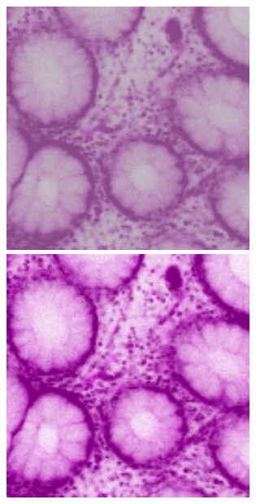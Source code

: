 \begin{figure}[H]
	\centering
	
	\begin{minipage}{0.25\columnwidth}
		\centering
		\includegraphics[clip, width=\linewidth]{fig/preprocessing/data_aug/color/CONTRAST/CONTRAST_0_50}
	\end{minipage}
	\begin{minipage}{0.25\columnwidth}
		\centering
		\includegraphics[clip, width=\linewidth]{fig/preprocessing/data_aug/color/CONTRAST/CONTRAST_1_00}

\end{minipage}
\end{figure}
